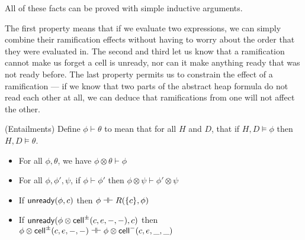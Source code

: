All of these facts can be proved with simple inductive arguments. 

The first property means that if we evaluate two expressions, we can
simply combine their ramification effects without having to worry
about the order that they were evaluated in. The second and third let
us know that a ramification cannot make us forget a cell is unready,
nor can it make anything ready that was not ready before. The last
property permits us to constrain the effect of a ramification --- if we
know that two parts of the abstract heap formula do not read each
other at all, we can deduce that ramifications from one will not
affect the other.

\begin{prop}{(Entailments)}
Define $\phi \vdash \theta$ to mean that for all $H$ and $D$, that if $H, D \models \phi$ then 
$H, D \models \theta$. 

\begin{itemize}
\item For all $\phi, \theta$, we have $\phi \otimes \theta \vdash \phi$
\item For all $\phi, \phi', \psi$, if $\phi \vdash \phi'$ then $\phi \otimes \psi \vdash \phi' \otimes \psi$  
\item If $\mathsf{unready}({\phi}, {c})$ then $\phi \dashv\vdash R(\{{c}\}, \phi)$
\item If $\mathsf{unready}({\phi \otimes \mathsf{cell}^{\pm}({c}, {e}, {-}, {-})}, {c})$ then $\phi \otimes \mathsf{cell}^{\pm}({c}, {e}, {-}, {-}) \dashv\vdash \phi \otimes \mathsf{cell}^{-}({c}, {e}, {\_}, {\_})$
\end{itemize}
\end{prop}

